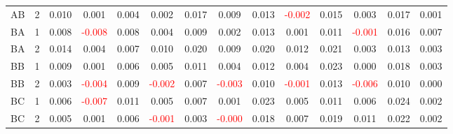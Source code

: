 \begin{table}[!htb]
{\begin{tabular}{llcccccccccccc}
AB & 2 & 0.010 & 0.001 & 0.004 & 0.002 & 0.017 & 0.009 & 0.013 & \textcolor{red}{-0.002} & 0.015 & 0.003 & 0.017 & 0.001\\
BA & 1 & 0.008 & \textcolor{red}{-0.008} & 0.008 & 0.004 & 0.009 & 0.002 & 0.013 & 0.001 & 0.011 & \textcolor{red}{-0.001} & 0.016 & 0.007\\
BA & 2 & 0.014 & 0.004 & 0.007 & 0.010 & 0.020 & 0.009 & 0.020 & 0.012 & 0.021 & 0.003 & 0.013 & 0.003\\
BB & 1 & 0.009 & 0.001 & 0.006 & 0.005 & 0.011 & 0.004 & 0.012 & 0.004 & 0.023 & 0.000 & 0.018 & 0.003\\
BB & 2 & 0.003 & \textcolor{red}{-0.004} & 0.009 & \textcolor{red}{-0.002} & 0.007 & \textcolor{red}{-0.003} & 0.010 & \textcolor{red}{-0.001} & 0.013 & \textcolor{red}{-0.006} & 0.010 & 0.000\\
BC & 1 & 0.006 & \textcolor{red}{-0.007} & 0.011 & 0.005 & 0.007 & 0.001 & 0.023 & 0.005 & 0.011 & 0.006 & 0.024 & 0.002\\
BC & 2 & 0.005 & 0.001 & 0.006 & \textcolor{red}{-0.001} & 0.003 & \textcolor{red}{-0.000} & 0.018 & 0.007 & 0.019 & 0.011 & 0.022 & 0.002\\
\hline
    \end{tabular}%
    }
\end{table}

